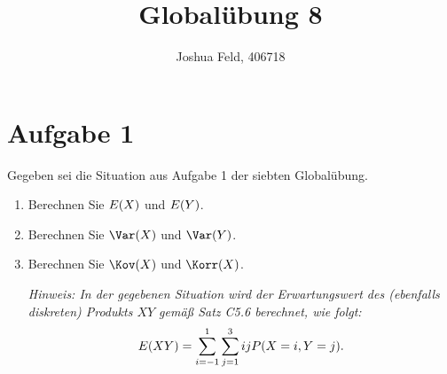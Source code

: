 \documentclass{exercise}
\institute{Institut für Statistik und Wirtschaftsmathematik}
\title{Globalübung 8}
\author{Joshua Feld, 406718}
\begin{document}
    \maketitle


    \section*{Aufgabe 1}

    \begin{problem}
        Gegeben sei die Situation aus Aufgabe 1 der siebten Globalübung.
        \begin{enumerate}
            \item Berechnen Sie \(E\parentheses*{X}\) und \(E\parentheses*{Y}\).
            \item Berechnen Sie \(\Var\parentheses*{X}\) und \(\Var\parentheses*{Y}\).
            \item Berechnen Sie \(\Kov\parentheses*{X}\) und \(\Korr\parentheses*{X}\).
            
            \emph{Hinweis: In der gegebenen Situation wird der Erwartungswert des (ebenfalls diskreten) Produkts \(XY\) gemäß Satz C5.6 berechnet, wie folgt:
            \[
                E\parentheses*{XY} = \sum_{i = -1}^1 \sum_{j = 1}^3 ijP\parentheses*{X = i, Y = j}.
            \]}
        \end{enumerate}
    \end{problem}
    
\end{document}
